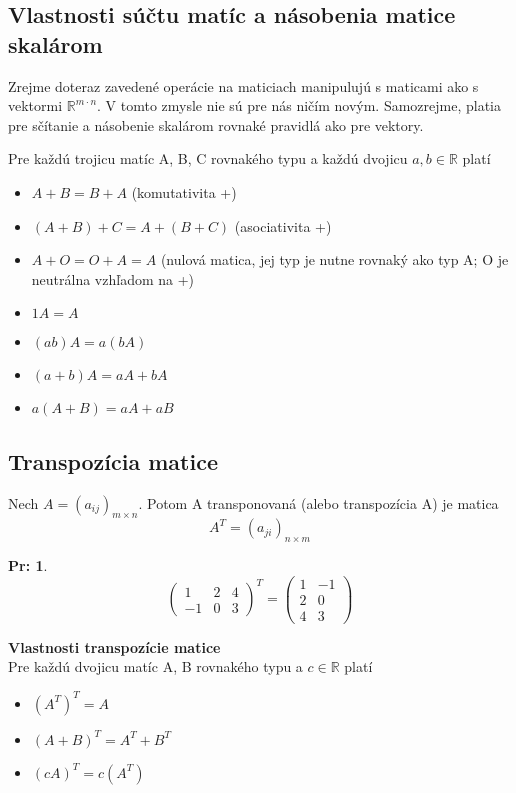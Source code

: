 \documentclass[12pt, a4paper]{article}
\theoremstyle{definition}
\newtheorem*{example}{Pr:}
\begin{document}
\subsection*{Vlastnosti súčtu matíc a násobenia matice skalárom}
Zrejme doteraz zavedené operácie na maticiach manipulujú s maticami ako s vektormi $\mathbb{R}^{m \cdot n}$. V tomto zmysle nie sú pre nás ničím novým.
Samozrejme, platia pre sčítanie a násobenie skalárom rovnaké pravidlá ako pre vektory.

Pre každú trojicu matíc A, B, C rovnakého typu a každú dvojicu $a, b \in \mathbb{R}$ platí
\begin{itemize}
    \item $A + B = B + A$ (komutativita +)
    \item $(A + B) + C = A + (B + C)$ (asociativita +)
    \item $A + O = O + A = A$ \quad (nulová matica, jej typ je nutne rovnaký ako typ A; O je neutrálna vzhľadom na +)
    \item $1A = A$
    \item $(ab)A = a(bA)$
    \item $(a+b)A = aA + bA$
    \item $a(A+B) = aA + aB$
\end{itemize}

\subsection*{Transpozícia matice}
Nech $A = (a_{ij})_{m \times n}$. Potom A transponovaná (alebo transpozícia A) je matica
\[ A^T = (a_{ji})_{n \times m} \]
\begin{example}
\[ \begin{pmatrix} 1 & 2 & 4 \\ -1 & 0 & 3 \end{pmatrix}^T = \begin{pmatrix} 1 & -1 \\ 2 & 0 \\ 4 & 3 \end{pmatrix} \]
\end{example}

\textbf{Vlastnosti transpozície matice} \\
Pre každú dvojicu matíc A, B rovnakého typu a $c \in \mathbb{R}$ platí
\begin{itemize}
    \item $(A^T)^T = A$
    \item $(A + B)^T = A^T + B^T$
    \item $(cA)^T = c(A^T)$
\end{itemize}
\end{document}
